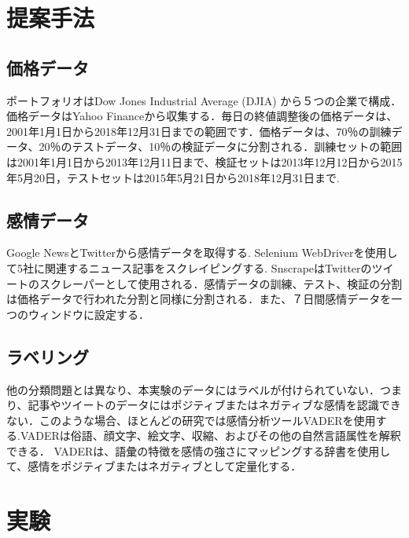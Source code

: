\documentclass[submit,techrep,noauthor]{ipsj}
\begin{document}
\section{提案手法}
\subsection{価格データ}
ポートフォリオはDow Jones Industrial Average (DJIA) から５つの企業で構成．価格データはYahoo Financeから収集する．毎日の終値調整後の価格データは、2001年1月1日から2018年12月31日までの範囲です．価格データは、70％の訓練データ、20％のテストデータ、10％の検証データに分割される．訓練セットの範囲は2001年1月1日から2013年12月11日まで、検証セットは2013年12月12日から2015年5月20日，テストセットは2015年5月21日から2018年12月31日まで.
\subsection{感情データ}
Google NewsとTwitterから感情データを取得する. Selenium WebDriverを使用して5社に関連するニュース記事をスクレイピングする. SnscrapeはTwitterのツイートのスクレーパーとして使用される．感情データの訓練、テスト、検証の分割は価格データで行われた分割と同様に分割される．また、７日間感情データを一つのウィンドウに設定する．
\subsection{ラベリング}
他の分類問題とは異なり、本実験のデータにはラベルが付けられていない．つまり、記事やツイートのデータにはポジティブまたはネガティブな感情を認識できない．このような場合、ほとんどの研究では感情分析ツールVADERを使用する.VADERは俗語、顔文字、絵文字、収縮、およびその他の自然言語属性を解釈できる． VADERは、語彙の特徴を感情の強さにマッピングする辞書を使用して、感情をポジティブまたはネガティブとして定量化する． 

\section{実験}
\end{document}
